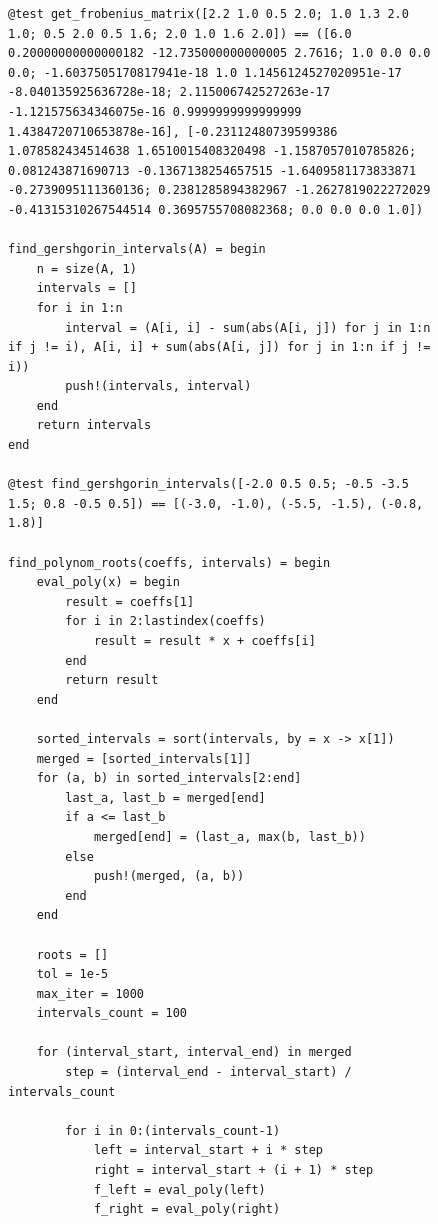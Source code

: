 \documentclass[a4paper, 14pt]{extarticle}
\begin{document}

\begin{figure}[!htb]
\begin{lstlisting}[language={},caption={Метод Данилевского (продолжение)},label={lst:code2}]
@test get_frobenius_matrix([2.2 1.0 0.5 2.0; 1.0 1.3 2.0 1.0; 0.5 2.0 0.5 1.6; 2.0 1.0 1.6 2.0]) == ([6.0 0.20000000000000182 -12.735000000000005 2.7616; 1.0 0.0 0.0 0.0; -1.6037505170817941e-18 1.0 1.1456124527020951e-17 -8.040135925636728e-18; 2.115006742527263e-17 -1.121575634346075e-16 0.9999999999999999 1.4384720710653878e-16], [-0.23112480739599386 1.078582434514638 1.6510015408320498 -1.1587057010785826; 0.081243871690713 -0.1367138254657515 -1.6409581173833871 -0.2739095111360136; 0.2381285894382967 -1.2627819022272029 -0.41315310267544514 0.3695755708082368; 0.0 0.0 0.0 1.0])

find_gershgorin_intervals(A) = begin
    n = size(A, 1)
    intervals = []
    for i in 1:n
        interval = (A[i, i] - sum(abs(A[i, j]) for j in 1:n if j != i), A[i, i] + sum(abs(A[i, j]) for j in 1:n if j != i))
        push!(intervals, interval)
    end
    return intervals
end

@test find_gershgorin_intervals([-2.0 0.5 0.5; -0.5 -3.5 1.5; 0.8 -0.5 0.5]) == [(-3.0, -1.0), (-5.5, -1.5), (-0.8, 1.8)]

find_polynom_roots(coeffs, intervals) = begin
    eval_poly(x) = begin
        result = coeffs[1]
        for i in 2:lastindex(coeffs)
            result = result * x + coeffs[i]
        end
        return result
    end

    sorted_intervals = sort(intervals, by = x -> x[1])
    merged = [sorted_intervals[1]]
    for (a, b) in sorted_intervals[2:end]
        last_a, last_b = merged[end]
        if a <= last_b
            merged[end] = (last_a, max(b, last_b))
        else
            push!(merged, (a, b))
        end
    end

    roots = []
    tol = 1e-5
    max_iter = 1000
    intervals_count = 100

    for (interval_start, interval_end) in merged
        step = (interval_end - interval_start) / intervals_count

        for i in 0:(intervals_count-1)
            left = interval_start + i * step
            right = interval_start + (i + 1) * step
            f_left = eval_poly(left)
            f_right = eval_poly(right)
\end{lstlisting}
\end{figure}
\end{document}
